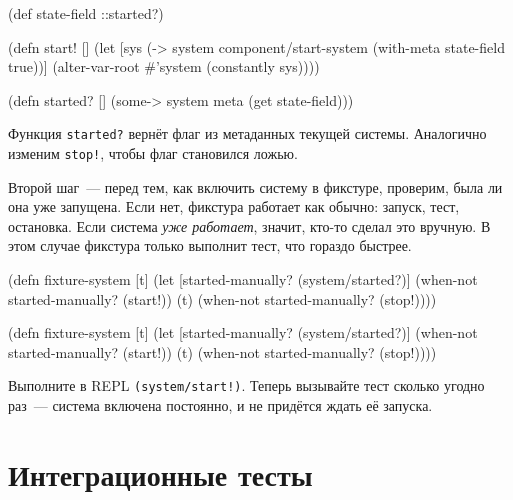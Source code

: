 \else

\begin{english}
  \begin{clojure}
(def state-field ::started?)

(defn start! []
  (let [sys (-> system
                component/start-system
                (with-meta {state-field true}))]
    (alter-var-root #'system (constantly sys))))

(defn started? []
  (some-> system meta (get state-field)))
  \end{clojure}
\end{english}

\fi

Функция \verb|started?| вернёт флаг из метаданных текущей системы. Аналогично
изменим \verb|stop!|, чтобы флаг становился ложью.

Второй шаг~--- перед тем, как включить систему в фикстуре, проверим, была ли она
уже запущена. Если нет, фикстура работает как обычно: запуск, тест,
остановка. Если система \emph{уже работает}, значит, кто-то сделал это
вручную. В этом случае фикстура только выполнит тест, что гораздо быстрее.

\ifx\devicetype\mobile

\begin{english}
  \begin{clojure}
(defn fixture-system [t]
  (let [started-manually?
        (system/started?)]
    (when-not started-manually?
      (start!))
    (t)
    (when-not started-manually?
      (stop!))))
  \end{clojure}
\end{english}

\else

\begin{english}
  \begin{clojure}
(defn fixture-system [t]
  (let [started-manually? (system/started?)]
    (when-not started-manually?
      (start!))
    (t)
    (when-not started-manually?
      (stop!))))
  \end{clojure}
\end{english}

\fi

Выполните в REPL \verb|(system/start!)|. Теперь вызывайте тест сколько угодно
раз~--- система включена постоянно, и не придётся ждать её запуска.

\section{Интеграционные тесты}

